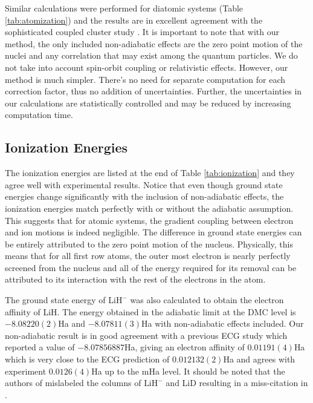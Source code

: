 \documentclass[aps,prl,superscriptaddress,groupedaddress]{revtex4}
\begin{document}
Similar calculations were performed for diatomic systems (Table \ref{tab:atomization}) and the results are in excellent agreement with the sophisticated coupled cluster study \cite{Feller_Corrections}. It is important to note that with our method, the only included non-adiabatic effects are the zero point motion of the nuclei and any correlation that may exist among the quantum particles. We do not take into account spin-orbit coupling or relativistic effects. However, our method is much simpler. There's no need for separate computation for each correction factor, thus no addition of uncertainties. Further, the uncertainties in our calculations are statistically controlled and may be reduced by increasing computation time. 

\subsection{Ionization Energies}
The ionization energies are listed at the end of Table \ref{tab:ionization} and they agree well with experimental results. Notice that even though ground state energies change significantly with the inclusion of non-adiabatic effects, the ionization energies match perfectly with or without the adiabatic assumption. This suggests that for atomic systems, the gradient coupling between electron and ion motions is indeed negligible. The difference in ground state energies can be entirely attributed to the zero point motion of the nucleus. Physically, this means that for all first row atoms, the outer most electron is nearly perfectly screened from the nucleus and all of the energy required for its removal can be attributed to its interaction with the rest of the electrons in the atom.

The ground state energy of $\text{LiH}^-$ was also calculated to obtain the electron affinity of LiH. The energy obtained in the adiabatic limit at the DMC level is $-8.08220(2)$Ha and $-8.07811(3)$Ha with non-adiabatic effects included. Our non-adiabatic result is in good agreement with a previous ECG study \cite{Bubin_LiH_noBO} which reported a value of $-8.07856887$Ha, giving an electron affinity of $0.01191(4)$Ha which is very close to the ECG prediction of $0.012132(2)$Ha and agrees with experiment $0.0126(4)$Ha up to the mHa level.  It should be noted that the authors of \cite{Bubin_LiH_noBO} mislabeled the columns of $\text{LiH}^-$ and LiD resulting in a miss-citation in \cite{Mitroy_ECG}.
\end{document}
